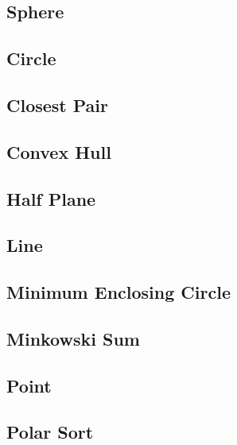\subsection{Sphere}
\raggedbottom
\hrulefill
\subsection{Circle}
\raggedbottom
\hrulefill
\subsection{Closest Pair}
\raggedbottom
\hrulefill
\subsection{Convex Hull}
\raggedbottom
\hrulefill
\subsection{Half Plane}
\raggedbottom
\hrulefill
\subsection{Line}
\raggedbottom
\hrulefill
\subsection{Minimum Enclosing Circle}
\raggedbottom
\hrulefill
\subsection{Minkowski Sum}
\raggedbottom
\hrulefill
\subsection{Point}
\raggedbottom
\hrulefill
\subsection{Polar Sort}
\raggedbottom
\hrulefill
